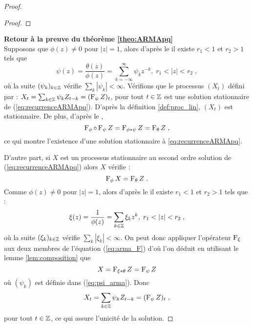 \begin{proof}
\begin{proof}
\end{proof}

\textbf{Retour \`a la preuve du th\'eor\`eme \ref{theo:ARMApq}}\\

Supposons que $\phi(z)\neq 0$ pour $|z|= 1$, alors d'apr\`es
le  il existe $r_1<1$ et $r_2>1$ tels que
\begin{equation}\label{eq:psi_arma}
\psi(z)=\frac{\theta(z)}{\phi(z)}=\sum_{k=-\infty}^{\infty} \psi_k z^{-k},\; r_1<|z|<r_2\;,
\end{equation}
o\`u la suite $(\psi_k)_{k\in\mathbb{Z}}$ v\'erifie $\sum_k |\psi_k|<\infty$.
V\'erifions que le processus $(X_t)$ d\'efini par : $X_t=\sum_{k\in\mathbb{Z}} \psi_k Z_{t-k}=(\operatorname{F}_{\psi} Z)_t$, pour tout
$t\in\mathbb{Z}$ est une solution stationnaire de (\ref{eq:recurrenceARMApq}). D'apr\`es la d\'efinition
\ref{def:proc_lin}, $(X_t)$ est stationnaire. De plus, d'apr\`es le ,
$$
\operatorname{F}_{\phi} \circ \operatorname{F}_{\psi} Z =\operatorname{F}_{\phi*\psi}Z=\operatorname{F}_{\theta}Z \;,
$$
ce qui montre l'existence d'une solution
stationnaire \`a \eqref{eq:recurrenceARMApq}.

D'autre part, si $X$ est un processus stationnaire au second ordre solution de
(\ref{eq:recurrenceARMApq}) alors $X$ v\'erifie :
\begin{equation}\label{eq:arma_F}
\operatorname{F}_{\phi} X=\operatorname{F}_{\theta}Z\;.
\end{equation}
Comme $\phi(z)\neq 0$ pour $|z|= 1$, alors d'apr\`es le
 il existe $r_1<1$ et $r_2>1$ tels que :
$$
\xi(z)=\frac{1}{\phi(z)}=\sum_{k\in\zset} \xi_k z^{k},\; r_1<|z|<r_2\;,
$$
o\`u la suite $(\xi_k)_{k\in\mathbb{Z}}$ v\'erifie $\sum_k |\xi_k|<\infty$.
On peut donc appliquer l'op\'erateur $\operatorname{F}_{\xi}$ aux deux membres de l'\'equation
(\ref{eq:arma_F}) d'o\`u l'on d\'eduit en utilisant le lemme \ref{lem:composition}
que 
$$
X=\operatorname{F}_{\xi * \theta}Z=\operatorname{F}_{\psi} Z 
$$ 
o\`u $(\psi_k)$ est d\'efinie dans (\ref{eq:psi_arma}).
Donc 
$$
X_t=\sum_{k\in\mathbb{Z}} \psi_k Z_{t-k}=(\operatorname{F}_{\psi} Z)_t \;, 
$$
pour tout
$t\in\mathbb{Z}$, ce qui assure l'unicit\'e de la solution.


\end{proof}
